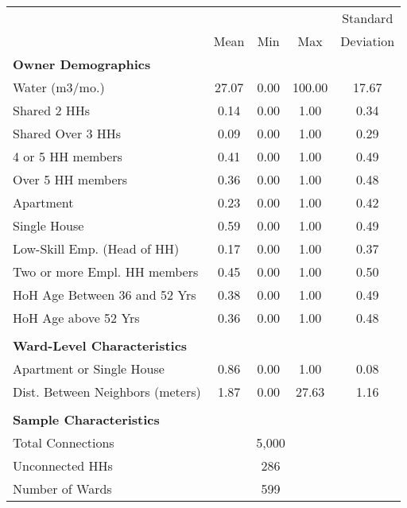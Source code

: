 \begin{tabular}{l*{1}{cccc}}
 & & & &Standard  \\
 &Mean &Min &Max &Deviation  \\
\textbf{Owner Demographics} &\multicolumn{4}{c}{ }\\
\hline
Water (m3/mo.) &      27.07  &       0.00  &     100.00  &      17.67   \\
Shared 2 HHs &       0.14  &       0.00  &       1.00  &       0.34   \\
Shared Over 3 HHs &       0.09  &       0.00  &       1.00  &       0.29   \\
4 or 5 HH members &       0.41  &       0.00  &       1.00  &       0.49   \\
Over 5 HH members &       0.36  &       0.00  &       1.00  &       0.48   \\
Apartment &       0.23  &       0.00  &       1.00  &       0.42   \\
Single House &       0.59  &       0.00  &       1.00  &       0.49   \\
Low-Skill Emp. (Head of HH) &       0.17  &       0.00  &       1.00  &       0.37   \\
Two or more Empl. HH members &       0.45  &       0.00  &       1.00  &       0.50   \\
HoH Age Between 36 and 52 Yrs &       0.38  &       0.00  &       1.00  &       0.49   \\
HoH Age above 52 Yrs &       0.36  &       0.00  &       1.00  &       0.48   \\
\hline \\
\textbf{Ward-Level Characteristics} &\multicolumn{4}{c}{ }\\
\hline
Apartment or Single House &       0.86  &       0.00  &       1.00  &       0.08   \\
Dist. Between Neighbors (meters) &       1.87  &       0.00  &      27.63  &       1.16   \\
\hline \\
\textbf{Sample Characteristics} &\multicolumn{4}{c}{ }\\
\hline
 Total Connections &\multicolumn{3}{c}{5,000 }\\
 Unconnected HHs &\multicolumn{3}{c}{286 }\\
 Number of Wards &\multicolumn{3}{c}{599 }\\
\hline
\hline
\end{tabular}